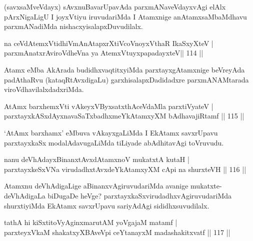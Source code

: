 \begin{artha}
(savxsaMveVdayx) sAvxnuBavarUpavAda parxmANaveVdayxvAgi elAlx pArxNigaLigU I joyxVtiyu iruvudariMda I Atamxnige anAtamxsaMbaMdhavu parxmANadiMda nishacxyisalapxDuvudilalx.
\end{artha}

\begin{shl}
na ceVdAtemxVtidhiVmAnAtapxrXtiVcoVnoyxV\s thaR IkaSxyXteV | \\
parxmAnatxrAviroVdheVna ya AtemxVtuyxpapadayxteV\hfill ||  114 ||  
\end{shl}

\begin{artha}
Atamx eMba AkArada budidhxvaqtitxyiMda parxtayxgAtamxnige beVreyAda padAthaRvu (kataqRtAvxdigaLu) garxhisalapxDadidadxre parxmANAMtarada viroVdhavilalxdadxriMda. 
\end{artha}

\begin{shl}
AtAmx barxhemxVti vAkeyxVByxsatxthAceVdaMla parxtiVyateV | \\
parxtayxkASxdAyxnavaSaTxbadhxmeYkAtamxyXM bAdhavajiRtamf \hfill||  115 ||  
\end{shl}

\begin{artha}
`AtAmx barxhamx' eMbuva vAkayxgaLiMda I EkAtamx savxrUpavu parxtayxkaSx modalAdavugaLiMda tiLiyade abAdhitavAgi toVruvudu.
\end{artha}


\begin{shl}
nanu deVhAdayxBinanxtAvxdAtamxnoV mukatxtA kutaH |  \\
parxtayxkeSxVNa virudadhxtAvxdeYkAtamxyXM cApi na shurxteVH \hfill||  116 ||  
\end{shl}

\begin{artha}
Atamxnu deVhAdigaLige aBinanxvAgiruvudariMda avanige mukatxte- deVhAdigaLa biDugaDe heVge? parxtayxkaSxvirudadhxvAgiruvudariMda shurxtiyiMda EkAtamx savxrUpavu sariyAdAgi sididhxsuvudilalx.
\end{artha}


\begin{shl}
tathA hi kiSxtitoVyAginxmarutAM yoVgajaM matamf | \\
parxteyxVkaM shakatxyXBAveV\s pi ceYtanayxM madashakitxvatf \hfill||  117 ||  
\end{shl}

